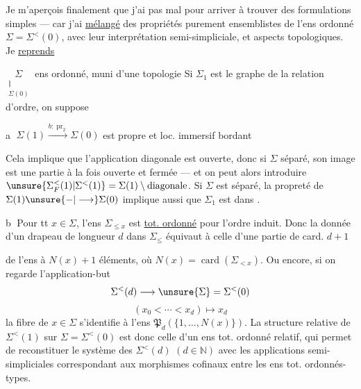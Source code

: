 Je m'aperçois finalement que j'ai
pas mal  pour arriver à trouver des
formulations simples --- car j'ai \uline{mélangé} des
propriétés purement ensemblistes de l'ens ordonné
$\Sigma=\Sigma^{<}(0)$, avec leur interprétation semi-simpliciale,
et  aspects topologiques. Je \uline{reprends}

$\underset{\substack{\Vert\\\Sigma(0)}}{\Sigma}$ ens ordonné, muni d'une topologie 
Si $\Sigma_1$ est le graphe de la relation d'ordre, on suppose

\textcircled{a} $\Sigma(1)\xrightarrow{b:\operatorname{pr}_2}\Sigma(0)$ est propre et loc. immersif bordant
 

 
Cela implique que l'application diagonale est
ouverte, donc si $\Sigma$ séparé, son image est une
partie à la fois ouverte et fermée --- et on
peut alors introduire $\unsure{\Sigma_F^{<}(1)|\Sigma^{<}(1)}=\Sigma(1)\setminus\text{diagonale}$.
Si $\Sigma$ est séparé, la propreté de $\Sigma(1)\unsure{-|\longrightarrow}\Sigma(0)$
implique aussi que $\Sigma_1$ est  dans \inserted{$\Sigma\times\Sigma$}.

\textcircled{b} Pour tt $x\in\Sigma$, l'ens  $\Sigma_{\leq x}$  est \uline{tot. ordonné}
pour l'ordre induit.
 Donc la donnée d'un drapeau  de longueur
$d$ dans $\Sigma_\leq$ équivaut à celle d'une partie de card. $d+1$

de l'ens à $N(x)+1$ éléments, où $N(x)=\operatorname{card}(\Sigma_{<x})$.
Ou encore, si on regarde l'application-but
\[
\Sigma^{<}(d)\longrightarrow\unsure{\Sigma}=\Sigma^{<}(0)
\]
\[
(x_0<\cdots<x_d)\longmapsto x_d
\]
la fibre de $x\in\Sigma$ s'identifie à l'ens 
$\mathfrak P_d(\{1,\ldots,N(x)\})$.
La structure relative de $\Sigma^{<}(1)$ sur $\Sigma=\Sigma^{<}(0)$
est donc celle d'un ens tot. ordonné relatif, qui
permet de reconstituer le système des $\Sigma^{<}(d)$
 $(d\in\mathbb N)$ avec les applications semi-simpliciales
correspondant aux morphismes cofinaux entre
les ens tot. ordonnés-types.

